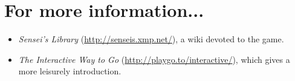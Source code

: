 \documentclass{article}
\begin{document}
\section*{For more information...}
\begin{itemize}

\item \emph{Sensei's Library} (\url{http://senseis.xmp.net/}), a wiki
  devoted to the game.

\item \emph{The Interactive Way to Go}
  (\url{http://playgo.to/interactive/}), which gives a more leisurely
  introduction.
\end{itemize}
\end{document}
